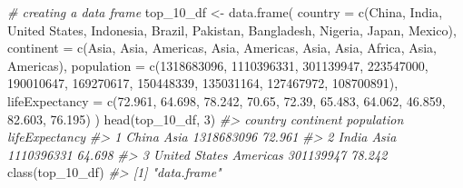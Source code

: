 \documentclass[
]{book}
\newenvironment{Shaded}{\begin{snugshade}}{\end{snugshade}}
\newcommand{\AttributeTok}[1]{\textcolor[rgb]{0.77,0.63,0.00}{#1}}
\newcommand{\CommentTok}[1]{\textcolor[rgb]{0.56,0.35,0.01}{\textit{#1}}}
\newcommand{\DecValTok}[1]{\textcolor[rgb]{0.00,0.00,0.81}{#1}}
\newcommand{\FloatTok}[1]{\textcolor[rgb]{0.00,0.00,0.81}{#1}}
\newcommand{\FunctionTok}[1]{\textcolor[rgb]{0.00,0.00,0.00}{#1}}
\newcommand{\NormalTok}[1]{#1}
\newcommand{\OtherTok}[1]{\textcolor[rgb]{0.56,0.35,0.01}{#1}}
\newcommand{\StringTok}[1]{\textcolor[rgb]{0.31,0.60,0.02}{#1}}
\begin{document}
\begin{Shaded}
\begin{Highlighting}[]
\CommentTok{\# creating a data frame}
\NormalTok{top\_10\_df }\OtherTok{\textless{}{-}} \FunctionTok{data.frame}\NormalTok{(}
\AttributeTok{country =} \FunctionTok{c}\NormalTok{(}\StringTok{\textquotesingle{}China\textquotesingle{}}\NormalTok{, }\StringTok{\textquotesingle{}India\textquotesingle{}}\NormalTok{, }\StringTok{\textquotesingle{}United States\textquotesingle{}}\NormalTok{, }\StringTok{\textquotesingle{}Indonesia\textquotesingle{}}\NormalTok{, }\StringTok{\textquotesingle{}Brazil\textquotesingle{}}\NormalTok{, }
            \StringTok{\textquotesingle{}Pakistan\textquotesingle{}}\NormalTok{, }\StringTok{\textquotesingle{}Bangladesh\textquotesingle{}}\NormalTok{, }\StringTok{\textquotesingle{}Nigeria\textquotesingle{}}\NormalTok{, }\StringTok{\textquotesingle{}Japan\textquotesingle{}}\NormalTok{, }\StringTok{\textquotesingle{}Mexico\textquotesingle{}}\NormalTok{),}
\AttributeTok{continent =} \FunctionTok{c}\NormalTok{(}\StringTok{\textquotesingle{}Asia\textquotesingle{}}\NormalTok{, }\StringTok{\textquotesingle{}Asia\textquotesingle{}}\NormalTok{, }\StringTok{\textquotesingle{}Americas\textquotesingle{}}\NormalTok{, }\StringTok{\textquotesingle{}Asia\textquotesingle{}}\NormalTok{, }\StringTok{\textquotesingle{}Americas\textquotesingle{}}\NormalTok{, }
              \StringTok{\textquotesingle{}Asia\textquotesingle{}}\NormalTok{, }\StringTok{\textquotesingle{}Asia\textquotesingle{}}\NormalTok{, }\StringTok{\textquotesingle{}Africa\textquotesingle{}}\NormalTok{, }\StringTok{\textquotesingle{}Asia\textquotesingle{}}\NormalTok{, }\StringTok{\textquotesingle{}Americas\textquotesingle{}}\NormalTok{),}
\AttributeTok{population =} \FunctionTok{c}\NormalTok{(}\DecValTok{1318683096}\NormalTok{, }\DecValTok{1110396331}\NormalTok{, }\DecValTok{301139947}\NormalTok{, }\DecValTok{223547000}\NormalTok{, }\DecValTok{190010647}\NormalTok{, }
               \DecValTok{169270617}\NormalTok{, }\DecValTok{150448339}\NormalTok{, }\DecValTok{135031164}\NormalTok{, }\DecValTok{127467972}\NormalTok{, }\DecValTok{108700891}\NormalTok{),}
\AttributeTok{lifeExpectancy =} \FunctionTok{c}\NormalTok{(}\FloatTok{72.961}\NormalTok{, }\FloatTok{64.698}\NormalTok{, }\FloatTok{78.242}\NormalTok{, }\FloatTok{70.65}\NormalTok{, }\FloatTok{72.39}\NormalTok{, }
                   \FloatTok{65.483}\NormalTok{, }\FloatTok{64.062}\NormalTok{, }\FloatTok{46.859}\NormalTok{, }\FloatTok{82.603}\NormalTok{, }\FloatTok{76.195}\NormalTok{)}
\NormalTok{    )}
\FunctionTok{head}\NormalTok{(top\_10\_df, }\DecValTok{3}\NormalTok{)}
\CommentTok{\#\textgreater{}         country continent population lifeExpectancy}
\CommentTok{\#\textgreater{} 1         China      Asia 1318683096         72.961}
\CommentTok{\#\textgreater{} 2         India      Asia 1110396331         64.698}
\CommentTok{\#\textgreater{} 3 United States  Americas  301139947         78.242}
\FunctionTok{class}\NormalTok{(top\_10\_df)}
\CommentTok{\#\textgreater{} [1] "data.frame"}


\end{Highlighting}
\end{Shaded}
\end{document}
